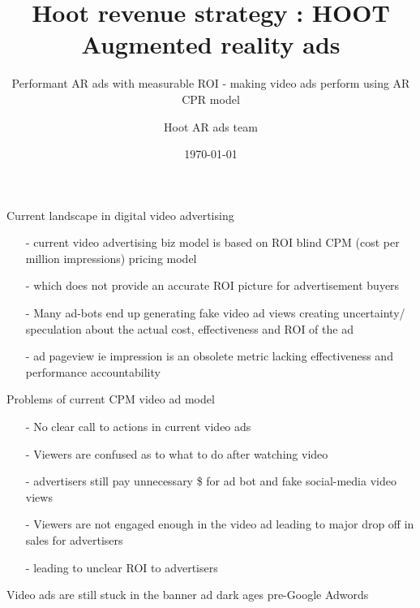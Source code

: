 \documentclass[12pt]{beamer}
\title{ Hoot revenue strategy : HOOT Augmented reality ads}
\subtitle{Performant AR ads with measurable ROI  - making video ads perform using AR CPR model}
\date{\today}
\author{Hoot AR ads team}
\institute{Hoot Live inc., a Delaware C-corp}
\begin{document}
\maketitle



\begin{frame}[fragile]{Current landscape in digital video advertising}
  \begin{itemize}[<+-| alert@+>]%
	  
\item[-]current video advertising biz model is based on ROI blind CPM (cost per million impressions) pricing model
\item[-]which does not provide an accurate ROI picture for advertisement buyers
\item[-]Many ad-bots end up generating fake video ad views creating uncertainty/ speculation about the actual cost, effectiveness and ROI of the ad
\item[-]ad pageview ie impression is an obsolete metric lacking effectiveness and performance accountability
\end{itemize}

\end{frame}
\begin{frame}[t]{Problems of current CPM video ad model}
\begin{itemize}
\item[-]No clear call to actions in current video ads
\pause
\item[-]Viewers are confused as to what to do after watching video
\pause
\item[-]advertisers still pay unnecessary \$ for ad bot  and fake social-media video views
\pause
\item[-]Viewers are not engaged enough in the video ad leading to  major drop off in sales for advertisers
\pause
\item[-]leading to unclear ROI to advertisers
\end{itemize}
\pause
Video ads are still stuck in the banner ad dark ages pre-Google Adwords

\end{frame}
\end{document}
